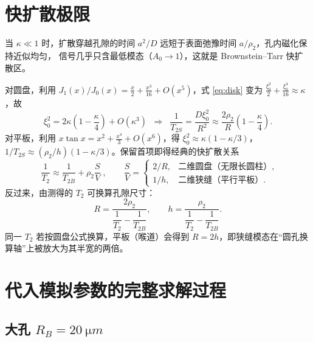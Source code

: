 \documentclass[11pt,a4paper]{article}
\newcommand{\TB}{T_{2B}}
\newcommand{\Ts}{T_{2S}}
\begin{document}
\section{快扩散极限}

当 $\kappa\ll1$ 时，扩散穿越孔隙的时间 $a^2/D$ 远短于表面弛豫时间 $a/\rho_2$，孔内磁化保持近似均匀，
信号几乎只含最低模态（$A_0\to1$），这就是 Brownstein–Tarr 快扩散区\citep{BrownsteinTarr1979}。

对圆盘，利用 $J_1(x)/J_0(x)=\tfrac{x}{2}+\tfrac{x^{3}}{16}+O(x^{5})$，式 \eqref{eq:disk} 变为
$\tfrac{\xi_0^{2}}{2}+\tfrac{\xi_0^{4}}{16}\approx\kappa$，故
\begin{equation}
\xi_0^{2}=2\kappa\left(1-\frac{\kappa}{4}\right)+O(\kappa^{3})
\;\;\Longrightarrow\;\;
\frac{1}{\Ts}=\frac{D\xi_0^{2}}{R^{2}}\approx\frac{2\rho_2}{R}\left(1-\frac{\kappa}{4}\right).
\end{equation}
对平板，利用 $x\tan x=x^{2}+\tfrac{x^{4}}{3}+O(x^{6})$，得 $\xi_0^{2}\approx\kappa(1-\kappa/3)$，
$1/\Ts\approx(\rho_2/h)(1-\kappa/3)$。保留首项即得经典的快扩散关系\citep{BrownsteinTarr1979,Kleinberg1994,Coates1999}
\begin{equation}
\boxed{\;\frac{1}{T_2}\approx\frac{1}{\TB}+\rho_2\frac{S}{V}\;},\qquad
\frac{S}{V}=
\begin{cases}
2/R, & \text{二维圆盘（无限长圆柱）},\\[2pt]
1/h, & \text{二维狭缝（平行平板）}.
\end{cases}
\label{eq:fd}
\end{equation}
反过来，由测得的 $T_2$ 可换算孔隙尺寸：
\begin{equation}
R=\frac{2\rho_2}{\dfrac{1}{T_2}-\dfrac{1}{\TB}},\qquad
h=\frac{\rho_2}{\dfrac{1}{T_2}-\dfrac{1}{\TB}} .
\label{eq:inverse}
\end{equation}
同一 $T_2$ 若按圆盘公式换算，平板（喉道）会得到 $R=2h$，即狭缝模态在“圆孔换算轴”上被放大为其半宽的两倍。

\section{代入模拟参数的完整求解过程}

\subsection{大孔 $R_B=\SI{20}{\micro m}$}
\end{document}
